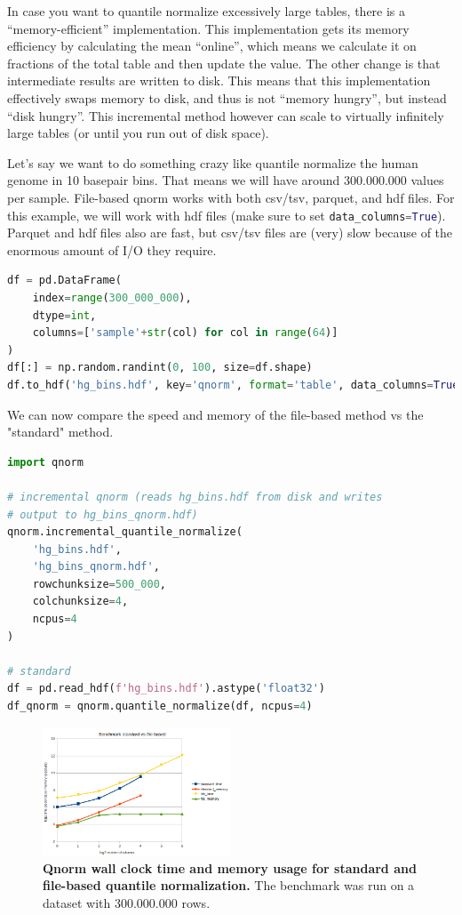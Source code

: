 In case you want to quantile normalize excessively large tables, there is a ``memory-efficient'' implementation. This implementation gets its memory efficiency by calculating the mean ``online'', which means we calculate it on fractions of the total table and then update the value. The other change is that intermediate results are written to disk. This means that this implementation effectively swaps memory to disk, and thus is not ``memory hungry'', but instead ``disk hungry''. This incremental method however can scale to virtually infinitely large tables (or until you run out of disk space).

Let's say we want to do something crazy like quantile normalize the human genome in 10 basepair bins. That means we will have around 300.000.000 values per sample. File-based qnorm works with both csv/tsv, parquet, and hdf files. For this example, we will work with hdf files (make sure to set \lstinline[language=Python]{data_columns=True}). Parquet and hdf files also are fast, but csv/tsv files are (very) slow because of the enormous amount of I/O they require.

\begin{lstlisting}[language=Python]
df = pd.DataFrame(
    index=range(300_000_000), 
    dtype=int, 
    columns=['sample'+str(col) for col in range(64)]
)
df[:] = np.random.randint(0, 100, size=df.shape)
df.to_hdf('hg_bins.hdf', key='qnorm', format='table', data_columns=True)
\end{lstlisting}

We can now compare the speed and memory of the file-based method vs the "standard" method.

\begin{lstlisting}[language=Python]
import qnorm

# incremental qnorm (reads hg_bins.hdf from disk and writes
# output to hg_bins_qnorm.hdf) 
qnorm.incremental_quantile_normalize(
    'hg_bins.hdf', 
    'hg_bins_qnorm.hdf', 
    rowchunksize=500_000, 
    colchunksize=4, 
    ncpus=4
)

# standard
df = pd.read_hdf(f'hg_bins.hdf').astype('float32')
df_qnorm = qnorm.quantile_normalize(df, ncpus=4)
\end{lstlisting}

\begin{figure}[H]
	\centering
	\includegraphics[width=0.5\textwidth]{ch.qnorm/imgs/benchmark_file.png}
	\caption{\label{fig:benchmark_file}\textbf{Qnorm wall clock time and memory usage for standard and file-based quantile normalization.} The benchmark was run on a dataset with 300.000.000 rows.}
\end{figure}

